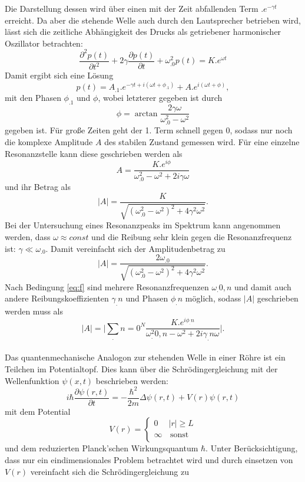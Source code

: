 Die Darstellung dessen wird über einen mit der Zeit abfallenden Term $.e^{-\gamma t}$ erreicht.
Da aber die stehende Welle auch durch den Lautsprecher betrieben wird, lässt sich die zeitliche Abhängigkeit des Drucks als getriebener harmonischer Oszillator betrachten:
\[
\frac{\partial^2p(t)}{\partial t^2}+2\gamma\frac{\partial p(t)}{\partial t}+\omega_.0^2p(t)=K .e^{\omega t}
\]
Damit ergibt sich eine Lösung 
\[
p(t)=A_.1 .e^{-\gamma t+i(\omega t+\phi_.1)}+A .e^{i(\omega t + \phi)},
\]
mit den Phasen $\phi_.1$ und $\phi$, wobei letzterer gegeben ist durch 
\[
\phi=\arctan{\frac{2\gamma\omega}{\omega^2_.0-\omega^2}}
\]
gegeben ist.
Für große Zeiten geht der 1. Term schnell gegen $0$, sodass nur noch die komplexe Amplitude $A$ des stabilen Zustand gemessen wird.
Für eine einzelne Resonanzstelle kann diese geschrieben werden als
\[
A=\frac{K .e^{i\phi}}{\omega^2_.0-\omega^2+2i\gamma\omega}
\]
und ihr Betrag als
\[
|A|=\frac{K}{\sqrt{\left(\omega^2_.0-\omega^2\right)^2+4\gamma^2\omega^2}}\text{.}
\]
Bei der Untersuchung eines Resonanzpeaks im Spektrum kann angenommen werden, dass $\omega\approx const$ und die Reibung sehr klein gegen die Resonanzfrequenz ist: $\gamma\ll\omega_.0$. Damit vereinfacht sich der Amplitudenbetrag zu
\[
|A|=\frac{2\omega_.0}{\sqrt{\left(\omega^2_.0-\omega^2\right)^2+4\gamma^2\omega^2}}\text{.}
\]
Nach Bedingung \eqref{eq:f} sind mehrere Resonanzfrequenzen $\omega_.{0,n}$ und damit auch andere Reibungskoeffizienten $\gamma_.n$ und Phasen $\phi_.n$ möglich, sodass $|A|$ geschrieben werden muss als
\begin{equation}
|A|=\biggl|\sum_.{n=0}^N\frac{K .e^{i\phi_.n}}{\omega^2_.{0,n}-\omega^2+2 i\gamma_.n\omega}\biggl|\text{.}\label{eq:absA}
\end{equation}
\\
\newline
Das quantenmechanische Analogon zur stehenden Welle in einer Röhre ist ein Teilchen im Potentialtopf.
Dies kann über die Schrödingergleichung mit der Wellenfunktion $\psi(x,t)$ beschrieben werden:
\[
i\hbar\frac{\partial\psi(r,t)}{\partial t}=-\frac{\hbar^2}{2m}\Delta\psi(r,t) + V(r)\psi(r,t)
\]
mit dem Potential 
\[V(r) = \left\{
\begin{array}{ll}
0 & |r| \geq L \\
\infty & \, \textrm{sonst} \\
\end{array}
\right.
\]
und dem reduzierten Planck'schen Wirkungsquantum $\hbar$.
Unter Berücksichtigung, dass nur ein eindimensionales Problem betrachtet wird und durch einsetzen von $V(r)$ vereinfacht sich die Schrödingergleichung zu
